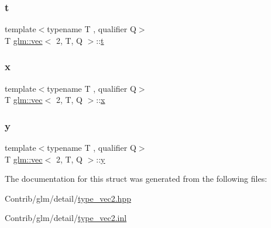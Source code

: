 \subsubsection{\texorpdfstring{t}{t}}
{\footnotesize\ttfamily template$<$typename T , qualifier Q$>$ \\
T \mbox{\hyperlink{structglm_1_1vec}{glm\+::vec}}$<$ 2, T, Q $>$\+::\mbox{\hyperlink{_s_d_l__opengl_8h_a7d65d00ca3b0630d9b5c52df855b19f5}{t}}}

\mbox{\label{structglm_1_1vec_3_012_00_01_t_00_01_q_01_4_a49302c697fe0183c08329f51cdf70894}} 
\subsubsection{\texorpdfstring{x}{x}}
{\footnotesize\ttfamily template$<$typename T , qualifier Q$>$ \\
T \mbox{\hyperlink{structglm_1_1vec}{glm\+::vec}}$<$ 2, T, Q $>$\+::\mbox{\hyperlink{_s_d_l__opengl_8h_ad0e63d0edcdbd3d79554076bf309fd47}{x}}}

\mbox{\label{structglm_1_1vec_3_012_00_01_t_00_01_q_01_4_ad674beb9a1e35fe0390507911daad747}} 
\subsubsection{\texorpdfstring{y}{y}}
{\footnotesize\ttfamily template$<$typename T , qualifier Q$>$ \\
T \mbox{\hyperlink{structglm_1_1vec}{glm\+::vec}}$<$ 2, T, Q $>$\+::\mbox{\hyperlink{_s_d_l__opengl_8h_a1675d9d7bb68e1657ff028643b4037e3}{y}}}



The documentation for this struct was generated from the following files\+:\begin{DoxyCompactItemize}
\item 
Contrib/glm/detail/\mbox{\hyperlink{type__vec2_8hpp}{type\+\_\+vec2.\+hpp}}\item 
Contrib/glm/detail/\mbox{\hyperlink{type__vec2_8inl}{type\+\_\+vec2.\+inl}}\end{DoxyCompactItemize}
